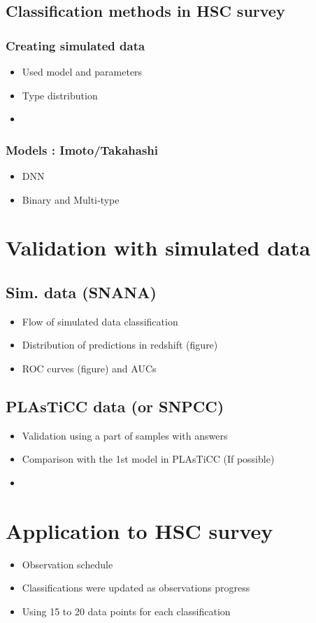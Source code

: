 \documentclass{pasj01}
\begin{document}
\subsection{Classification methods in HSC survey}
%
\subsubsection{Creating simulated data}
\begin{itemize}
\item Used model and parameters
\item Type distribution
\item 
\end{itemize}
%
\subsubsection{Models : Imoto/Takahashi}
\begin{itemize}
\item DNN
\item Binary and Multi-type
\end{itemize}
%
%
\section{Validation with simulated data}
\subsection{Sim. data (SNANA)}
\begin{itemize}
\item Flow of simulated data classification
\item Distribution of predictions in redshift (figure)
\item ROC curves (figure) and AUCs
\end{itemize}
%
\subsection{PLAsTiCC data (or SNPCC)}
\begin{itemize}
\item Validation using a part of samples with answers
\item Comparison with the 1st model in PLAsTiCC (If possible)
\item 
\end{itemize}
%
\section{Application to HSC survey}
\begin{itemize}
\item Observation schedule
\item Classifications were updated as observations progress
\item Using 15 to 20 data points for each classification
\end{itemize}
%
\end{document}
